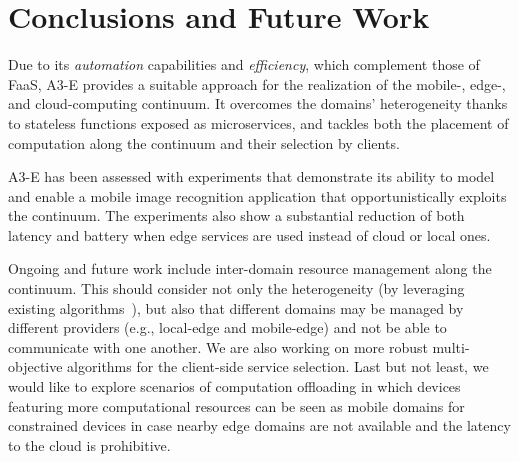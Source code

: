 \section{Conclusions and Future Work}\label{sec:conclusions}

Due to its \textit{automation} capabilities and \textit{efficiency}, which complement those of FaaS, A3-E provides a suitable approach for the realization of the mobile-, edge-, and cloud-computing continuum. It overcomes the domains' heterogeneity thanks to stateless functions exposed as microservices, and tackles both the placement of computation along the continuum and their selection by clients.

A3-E has been assessed with experiments that demonstrate its ability to model and enable a mobile image recognition application that opportunistically exploits the continuum. The experiments also show a substantial reduction of both latency and battery when edge services are used instead of cloud or local ones. 

Ongoing and future work include inter-domain resource management along the continuum. This should consider not only the heterogeneity (by leveraging existing algorithms~\cite{Tarneberg2017}), but also that different domains may be managed by different providers (e.g., local-edge and mobile-edge) and not be able to communicate with one another. We are also working on more robust multi-objective algorithms for the client-side service selection. 
Last but not least, 
we would like to explore scenarios of computation offloading in which devices featuring more computational resources can be seen as mobile domains for constrained devices in case nearby edge domains are not available and the latency to the cloud is prohibitive.